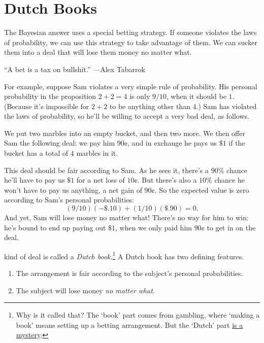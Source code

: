 \documentclass[justified]{tufte-book}
\providecommand{\tightlist}{%
  \setlength{\itemsep}{0pt}\setlength{\parskip}{0pt}}
\theoremstyle{definition}
\theoremstyle{definition}
\theoremstyle{definition}
\theoremstyle{definition}
\theoremstyle{remark}
\begin{document}
\hypertarget{dutch-books-1}{%
\section{Dutch Books}\label{dutch-books-1}}

The Bayesian answer uses a special betting strategy. If someone violates the laws of probability, we can use this strategy to take advantage of them. We can sucker them into a deal that will lose them money no matter what.

\begin{marginfigure}
``A bet is a tax on bullshit.'' ---Alex Tabarrok
\end{marginfigure}

For example, suppose Sam violates a very simple rule of probability. His personal probability in the proposition \(2+2=4\) is only \(9/10\), when it should be \(1\). (Because it's impossible for \(2+2\) to be anything other than \(4\).) Sam has violated the laws of probability, so he'll be willing to accept a very bad deal, as follows.

We put two marbles into an empty bucket, and then two more. We then offer Sam the following deal: we pay him \(90\)¢, and in exchange he pays us \(\$1\) if the bucket has a total of \(4\) marbles in it.

This deal should be fair according to Sam. As he sees it, there's a \(90\%\) chance he'll have to pay us \(\$1\) for a net loss of \(10\)¢. But there's also a \(10\%\) chance he won't have to pay us anything, a net gain of \(90\)¢. So the expected value is zero according to Sam's personal probabilities:
\[ (9/10)(-\$.10) + (1/10)(\$.90) = 0. \]
And yet, Sam will lose money no matter what! There's no way for him to win: he's bound to end up paying out \(\$1\), when we only paid him \(90\)¢ to get in on the deal.

 kind of deal is called a \emph{Dutch book}.\footnote{Why is it called that? The `book' part comes from gambling, where `making a book' means setting up a betting arrangement. But the `Dutch' part \href{https://personal.eur.nl/wakker/miscella/dutchbk.htm}{is a mystery}.} A Dutch book has two defining features.

\begin{enumerate}
\def\labelenumi{\arabic{enumi}.}
\tightlist
\item
  The arrangement is fair according to the subject's personal probabilities.
\item
  The subject will lose money \emph{no matter what}.
\end{enumerate}
\end{document}
